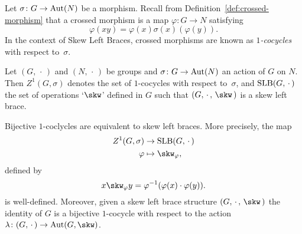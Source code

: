 \begin{defn}\label{def:1-cocycle}
    Let $\sigma\colon G\to{\rm Aut}(N)$ be a morphism. Recall from Definition~\ref{def:crossed-morphism} that a crossed morphism is a map $\varphi\colon G\to N$ satisfying
    $$
        \varphi(xy)=\varphi(x)\sigma(x)(\varphi(y)).
    $$
    In the context of Skew Left Braces, crossed morphisms are known as \textsl{$1$-cocycles} with respect to~$\sigma$.
\end{defn}

\begin{ntn}
    Let\/ $(G,\,\cdot\,)$ and\/ $(N,\,\cdot\,)$ be groups and\/ $\sigma\colon G\to{\rm Aut}(N)$ an action of\/ $G$ on\/ $N$. Then\/ $Z^1(G,\sigma)$ denotes the set of\/ $1$-cocycles with respect to\/~$\sigma$, and\/ $\operatorname{SLB}(G,\,\cdot\,)$ the set of operations {\rm `$\skw$'} defined in\/ $G$ such that\/ $(G,\,\cdot\,,\,\skw\,)$ is a skew left brace.
\end{ntn}

\begin{thm}
    Bijective\/ $1$-coclycles are equivalent to skew left braces. More precisely, the map
    \begin{align*}
        Z^1(G,\sigma)&\to\op{SLB}(G,\,\cdot\,)\\
        \varphi &\mapsto \skw_\varphi,
    \end{align*}
    defined by
    $$
        x\skw_\varphi y=\varphi^{-1}(\varphi(x)\cdot\varphi(y)).
    $$
    is well-defined. Moreover, given a skew left brace structure\/ $(G,\,\cdot\,,\,\skw\,)$ the identity of\/ $G$ is a bijective\/ $1$-cocycle with respect to the action\/ $\lambda\colon(G,\,\cdot\,)\to\Aut(G,\skw)$.
\end{thm}

